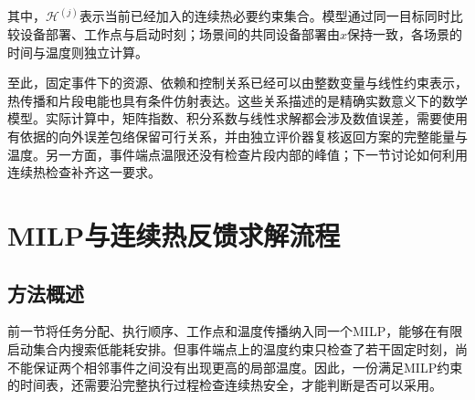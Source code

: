 其中，$\mathcal H^{(j)}$表示当前已经加入的连续热必要约束集合。模型通过同一目标同时比较设备部署、工作点与启动时刻；场景间的共同设备部署由$x$保持一致，各场景的时间与温度则独立计算。

至此，固定事件下的资源、依赖和控制关系已经可以由整数变量与线性约束表示，热传播和片段电能也具有条件仿射表达。这些关系描述的是精确实数意义下的数学模型。实际计算中，矩阵指数、积分系数与线性求解都会涉及数值误差，需要使用有依据的向外误差包络保留可行关系，并由独立评价器复核返回方案的完整能量与温度。另一方面，事件端点温限还没有检查片段内部的峰值；下一节讨论如何利用连续热检查补齐这一要求。



\section{MILP与连续热反馈求解流程}

\subsection{方法概述}

前一节将任务分配、执行顺序、工作点和温度传播纳入同一个MILP，能够在有限启动集合内搜索低能耗安排。但事件端点上的温度约束只检查了若干固定时刻，尚不能保证两个相邻事件之间没有出现更高的局部温度。因此，一份满足MILP约束的时间表，还需要沿完整执行过程检查连续热安全，才能判断是否可以采用。

